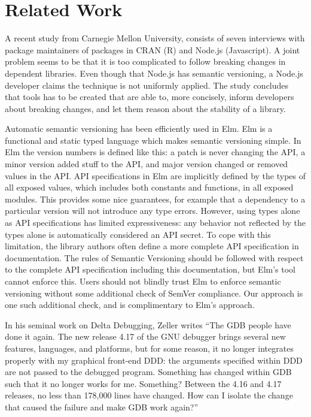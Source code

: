 \section{Related Work}

A recent study from Carnegie Mellon University\cite{bogart15-break}, consists of seven interviews
with package maintainers of packages in CRAN (R) and Node.js (Javascript). A
joint problem seems to be that it is too complicated to follow breaking changes
in dependent libraries. Even though that Node.js has semantic versioning, a
Node.js developer claims the technique is not uniformly applied. The study
concludes that tools has to be created that are able to, more concisely, inform
developers about breaking changes, and let them reason about the stability of a
library.

Automatic semantic versioning has been efficiently used in Elm. Elm is
a functional and static typed language which makes semantic versioning
simple. In Elm the version numbers is defined like this: a patch is
never changing the API, a minor version added stuff to the API, and
major version changed or removed values in the API. API specifications
in Elm are implicitly defined by the types of all exposed values,
which includes both constants and functions, in all exposed
modules. This provides some nice guarantees, for example that a
dependency to a particular version will not introduce any type
errors. However, using types alone as API specifications has limited
expressiveness: any behavior not reflected by the types alone is
automatically considered an API secret. To cope with this limitation,
the library authors often define a more complete API specification in
documentation. The rules of Semantic Versioning should be followed
with respect to the complete API specification including this
documentation, but Elm's tool cannot enforce this. Users should not
blindly trust Elm to enforce semantic versioning without some
additional check of SemVer compliance. Our approach is one such
additional check, and is complimentary to Elm's approach.

In his seminal work on Delta Debugging, Zeller writes ``The GDB people have done
it again. The new release 4.17 of the GNU debugger brings several new features,
languages, and platforms, but for some reason, it no longer integrates properly
with my graphical front-end DDD: the arguments specified within DDD are not
passed to the debugged program. Something has changed within GDB such that it
no longer works for me. Something? Between the 4.16 and 4.17 releases, no less
than 178,000 lines have changed. How can I isolate the change that caused the
failure and make GDB work again?''

